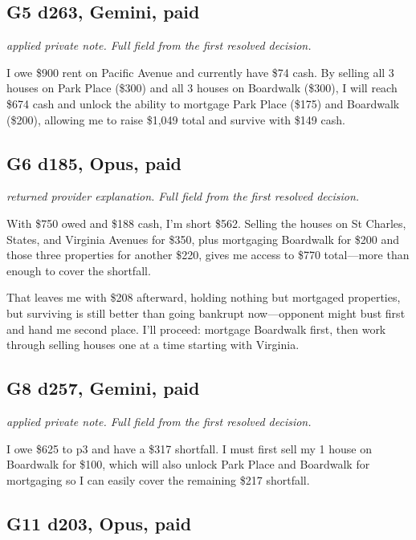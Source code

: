\subsection*{G5 d263, Gemini, paid}
{\small\textit{applied private note. Full field from the first resolved decision.}\par I owe \$900 rent on Pacific Avenue and currently have \$74 cash. By selling all 3 houses on Park Place (\$300) and all 3 houses on Boardwalk (\$300), I will reach \$674 cash and unlock the ability to mortgage Park Place (\$175) and Boardwalk (\$200), allowing me to raise \$1,049 total and survive with \$149 cash.\par}
\subsection*{G6 d185, Opus, paid}
{\small\textit{returned provider explanation. Full field from the first resolved decision.}\par With \$750 owed and \$188 cash, I'm short \$562. Selling the houses on St Charles, States, and Virginia Avenues for \$350, plus mortgaging Boardwalk for \$200 and those three properties for another \$220, gives me access to \$770 total—more than enough to cover the shortfall.\par That leaves me with \$208 afterward, holding nothing but mortgaged properties, but surviving is still better than going bankrupt now—opponent might bust first and hand me second place. I'll proceed: mortgage Boardwalk first, then work through selling houses one at a time starting with Virginia.\par \par}
\subsection*{G8 d257, Gemini, paid}
{\small\textit{applied private note. Full field from the first resolved decision.}\par I owe \$625 to p3 and have a \$317 shortfall. I must first sell my 1 house on Boardwalk for \$100, which will also unlock Park Place and Boardwalk for mortgaging so I can easily cover the remaining \$217 shortfall.\par}
\subsection*{G11 d203, Opus, paid}
